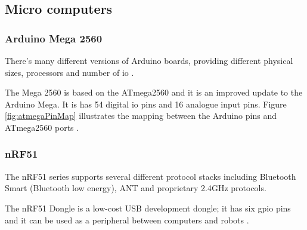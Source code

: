\subsection{Micro computers}
\subsubsection{Arduino Mega 2560}
There's many different versions of Arduino boards, providing different physical sizes, processors and number of \acrfull{io} \cite{arduinoboards}. 

The Mega 2560 is based on the ATmega2560 and it is an improved update to the Arduino Mega. It is has 54 digital \acrshort{io} pins and 16 analogue input pins. Figure \ref{fig:atmegaPinMap} illustrates the mapping between the Arduino pins and ATmega2560 ports \cite{arduinomega2560}. 


\subsubsection{nRF51}
The nRF51 series supports several different protocol stacks including Bluetooth Smart (Bluetooth low energy), ANT and proprietary 2.4GHz protocols. 

The nRF51 Dongle is a low-cost USB development dongle; it has six \acrfull{gpio} pins and it can be used as a peripheral between computers and robots \cite{nrf51Dongle}.


